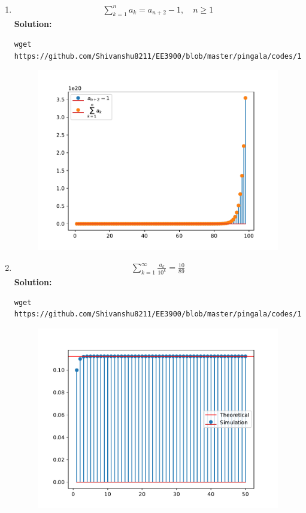 \documentclass[journal,12pt,twocolumn]{IEEEtran}
\newcommand{\solution}{\noindent \textbf{Solution: }}
\numberwithin{equation}{section}
\renewcommand\thesection{\arabic{section}}
\begin{document}
\begin{enumerate}[label=\thesection.\arabic*
,ref=\thesection.\theenumi]
\item 
\begin{align}
	\sum_{k=1}^{n}a_k = a_{n+2}-1, \quad n \ge 1
\end{align}
\solution
\begin{lstlisting}
wget https://github.com/Shivanshu8211/EE3900/blob/master/pingala/codes/1.1.py
\end{lstlisting}
\begin{figure}[!ht]
    \includegraphics[width=\columnwidth]{figs/1.1}
    \caption{}
\end{figure}
 \item 
\begin{align}
	\sum_{k=1}^{\infty}\frac{a_k}{10^k} =\frac{10}{89}
\end{align}
\solution
\begin{lstlisting}
wget https://github.com/Shivanshu8211/EE3900/blob/master/pingala/codes/1.2.py
\end{lstlisting}
\begin{figure}[!ht]
    \includegraphics[width=\columnwidth]{figs/1.2}

\end{figure}
\end{enumerate}
\end{document}
